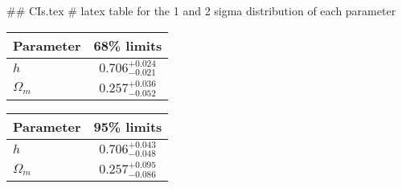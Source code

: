 ## CIs.tex
# latex table for the 1 and 2 sigma distribution of each parameter

\begin{tabular} { l  c}
 Parameter &  68\% limits\\
\hline
{\boldmath$h              $} & $0.706^{+0.024}_{-0.021}   $\\
{\boldmath$\Omega_m       $} & $0.257^{+0.036}_{-0.052}   $\\
\hline
\end{tabular}

\begin{tabular} { l  c}
 Parameter &  95\% limits\\
\hline
{\boldmath$h              $} & $0.706^{+0.043}_{-0.048}   $\\
{\boldmath$\Omega_m       $} & $0.257^{+0.095}_{-0.086}   $\\
\hline
\end{tabular}
